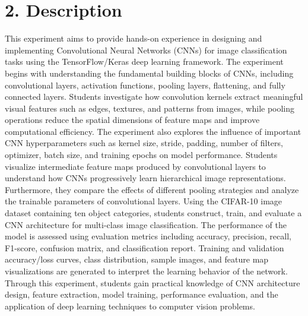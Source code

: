 \documentclass[11pt]{article}
\begin{document}
\section*{2. Description}
This experiment aims to provide hands-on experience in designing and implementing Convolutional Neural Networks (CNNs) for image classification tasks using the TensorFlow/Keras deep learning framework. The experiment begins with understanding the fundamental building blocks of CNNs, including convolutional layers, activation functions, pooling layers, flattening, and fully connected layers. Students investigate how convolution kernels extract meaningful visual features such as edges, textures, and patterns from images, while pooling operations reduce the spatial dimensions of feature maps and improve computational efficiency. The experiment also explores the influence of important CNN hyperparameters such as kernel size, stride, padding, number of filters, optimizer, batch size, and training epochs on model performance. Students visualize intermediate feature maps produced by convolutional layers to understand how CNNs progressively learn hierarchical image representations. Furthermore, they compare the effects of different pooling strategies and analyze the trainable parameters of convolutional layers. Using the CIFAR-10 image dataset containing ten object categories, students construct, train, and evaluate a CNN architecture for multi-class image classification. The performance of the model is assessed using evaluation metrics including accuracy, precision, recall, F1-score, confusion matrix, and classification report. Training and validation accuracy/loss curves, class distribution, sample images, and feature map visualizations are generated to interpret the learning behavior of the network. Through this experiment, students gain practical knowledge of CNN architecture design, feature extraction, model training, performance evaluation, and the application of deep learning techniques to computer vision problems.




\end{document}
